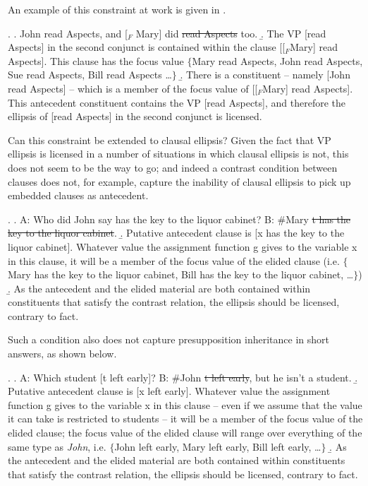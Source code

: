 \documentclass[doublespace]{umthesis}
\begin{document}
An example of this constraint at work is given in \Next.

\ex. 	\a. John read Aspects, and [$_{F}$ Mary] did \sout{read Aspects} too.
	\b. The VP [read Aspects] in the second conjunct is contained within the clause [[$_F$Mary] read Aspects]. This clause has the focus value $\{$Mary read Aspects, John read Aspects, Sue read Aspects, Bill read Aspects \ldots$\}$
	\b. There is a constituent -- namely [John read Aspects] -- which is a member of the focus value of [[$_F$Mary] read Aspects]. This antecedent constituent contains the VP [read Aspects], and therefore the ellipsis of [read Aspects] in the second conjunct is licensed.
	
Can this constraint be extended to clausal ellipsis? Given the fact that VP ellipsis is licensed in a number of situations in which clausal ellipsis is not, this does not seem to be the way to go; and indeed a contrast condition between clauses does not, for example, capture the inability of clausal ellipsis to pick up embedded clauses as antecedent.

\ex. 	\a. A: Who did John say has the key to the liquor cabinet? B: \#Mary \sout{t has the key to the liquor cabinet}.
	\b. Putative antecedent clause is [x has the key to the liquor cabinet]. Whatever value the assignment function g gives to the variable x in this clause, it will be a member of the focus value of the elided clause (i.e. $\{$Mary has the key to the liquor cabinet, Bill has the key to the liquor cabinet, \ldots$\}$)
	\b. As the antecedent and the elided material are both contained within constituents that satisfy the contrast relation, the ellipsis should be licensed, contrary to fact.
	
Such a condition also does not capture presupposition inheritance in short answers, as shown below.

\ex. 	\a. A: Which student [t left early]? B: \#John \sout{t left early}, but he isn't a student.
	\b. Putative antecedent clause is [x left early]. Whatever value the assignment function g gives to the variable x in this clause -- even if we assume that the value it can take is restricted to students -- it will be a member of the focus value of the elided clause; the focus value of the elided clause will range over everything of the same type as {\it John}, i.e. $\{$John left early, Mary left early, Bill left early, \ldots$\}$
	\b. As the antecedent and the elided material are both contained within constituents that satisfy the contrast relation, the ellipsis should be licensed, contrary to fact.
\end{document}
